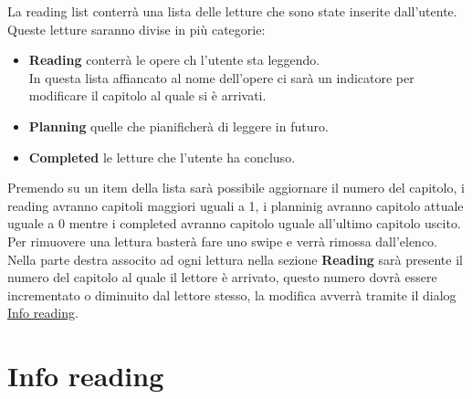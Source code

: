 \documentclass{report}
\begin{document}
La reading list conterrà una lista delle letture che sono state inserite dall'utente.\\
Queste letture saranno divise in più categorie:
\begin{itemize}
   \item \textbf{Reading} conterrà le opere ch l'utente sta leggendo.\\
   In questa lista affiancato al nome dell'opere ci sarà un indicatore per modificare il capitolo al quale si è arrivati.
   \item \textbf{Planning} quelle che pianificherà di leggere in futuro.
   \item \textbf{Completed} le letture che l'utente ha concluso.
\end{itemize}
Premendo su un item della lista sarà possibile aggiornare il numero del capitolo, i reading avranno capitoli maggiori uguali a 1, i planninig avranno capitolo attuale uguale a 0 mentre i completed avranno capitolo uguale all'ultimo capitolo uscito.\\
Per rimuovere una lettura basterà fare uno swipe e verrà rimossa dall'elenco.\\
Nella parte destra associto ad ogni lettura nella sezione \textbf{Reading} sarà presente il numero del capitolo al quale il lettore è arrivato, questo numero dovrà essere incrementato o diminuito dal lettore stesso, la modifica avverrà tramite il dialog \hyperref[sec:info_reading]{Info reading}.

\section{Info reading}\label{sec:info_reading}
\end{document}
